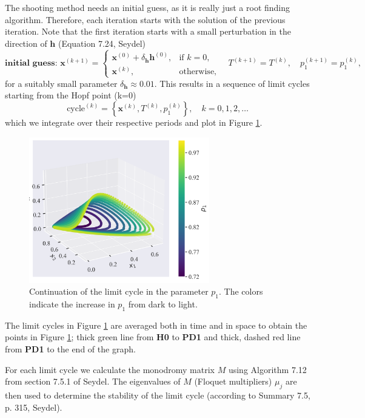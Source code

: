 The shooting method needs an initial guess, as it is really just a root finding algorithm. 
Therefore, each iteration starts with the solution of the previous iteration. 
Note that the first iteration starts with a small perturbation in the direction of $\mathbf{h}$ (Equation 7.24, Seydel)
\[
    \textbf{initial guess: }\mathbf{x}^{(k+1)} = 
    \begin{cases}
        \mathbf{x}^{(0)} + \delta_{\mathbf{h}}\mathbf{h}^{(0)}, & \text{if } k = 0, \\
        \mathbf{x}^{(k)}, & \text{otherwise},
    \end{cases}
    \quad T^{(k+1)} = T^{(k)}, \quad p_1^{(k+1)} = p_1^{(k)},
\]
for a suitably small parameter $\delta_{\mathbf{h}} \approx 0.01$. This results in a sequence of limit cycles starting from the Hopf point (k=0)
\[
    \textrm{cycle}^{(k)} = \left\{\mathbf{x}^{(k)}, T^{(k)}, p_1^{(k)} \right\}, \quad k = 0, 1, 2, \ldots
\]
which we integrate over their respective periods and plot in Figure \ref{fig:mcm_limit_cycle_continuation}.
\begin{figure}[H]
    \centering
    \includegraphics[width=0.7\textwidth]{figures/mcm_limit_cycles.png}
    \caption{Continuation of the limit cycle in the parameter $p_1$. The colors indicate the increase in $p_1$ from dark to light.}
    \label{fig:mcm_limit_cycle_continuation}
\end{figure}
The limit cycles in Figure \ref{fig:mcm_limit_cycle_continuation} are averaged both in time and in space to obtain the points in 
Figure \ref{fig:mcm_limit_cycle_continuation}; thick green line from \textbf{H0} to \textbf{PD1} and thick, dashed red line from 
\textbf{PD1} to the end of the graph.

For each limit cycle we calculate the monodromy matrix $M$ using Algorithm 7.12
from section 7.5.1 of Seydel. The eigenvalues of $M$ (Floquet multipliers) $\mu_j$ are then used to determine the stability of the limit cycle
(according to Summary 7.5, p. 315, Seydel).

